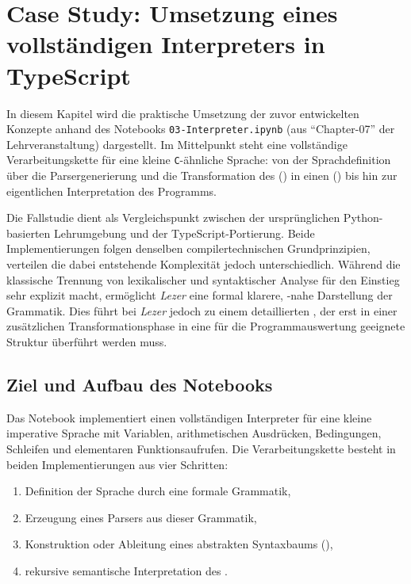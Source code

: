 \section{Case Study: Umsetzung eines vollständigen Interpreters in TypeScript}
\label{sec:case_study}

In diesem Kapitel wird die praktische Umsetzung der zuvor entwickelten Konzepte anhand des Notebooks \texttt{03-Interpreter.ipynb} (aus \enquote{Chapter-07} der Lehrveranstaltung) dargestellt. Im Mittelpunkt steht eine vollständige Verarbeitungskette für eine kleine \texttt{C}-ähnliche Sprache: von der Sprachdefinition über die Parsergenerierung und die Transformation des  () in einen  () bis hin zur eigentlichen Interpretation des Programms.

Die Fallstudie dient als Vergleichspunkt zwischen der ursprünglichen Python-basierten Lehrumgebung und der TypeScript-Portierung. Beide Implementierungen folgen denselben compilertechnischen Grundprinzipien, verteilen die dabei entstehende Komplexität jedoch unterschiedlich. Während \emph{} die klassische Trennung von lexikalischer und syntaktischer Analyse für den Einstieg sehr explizit macht, ermöglicht \emph{Lezer} eine formal klarere, -nahe Darstellung der Grammatik. Dies führt bei \emph{Lezer} jedoch zu einem detaillierten , der erst in einer zusätzlichen Transformationsphase in eine für die Programmauswertung geeignete Struktur überführt werden muss.

\subsection{Ziel und Aufbau des Notebooks}

Das Notebook implementiert einen vollständigen Interpreter für eine kleine imperative Sprache mit Variablen, arithmetischen Ausdrücken, Bedingungen, Schleifen und elementaren Funktionsaufrufen. Die Verarbeitungskette besteht in beiden Implementierungen aus vier Schritten:

\begin{enumerate}
    \item Definition der Sprache durch eine formale Grammatik,
    \item Erzeugung eines Parsers aus dieser Grammatik,
    \item Konstruktion oder Ableitung eines abstrakten Syntaxbaums (),
    \item rekursive semantische Interpretation des .
\end{enumerate}

